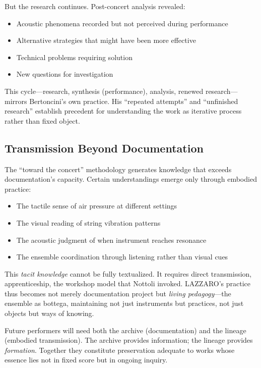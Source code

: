 But the research continues. Post-concert analysis revealed:
\begin{itemize}
  \item Acoustic phenomena recorded but not perceived during performance
  \item Alternative strategies that might have been more effective
  \item Technical problems requiring solution
  \item New questions for investigation
\end{itemize}

This cycle---research, synthesis (performance), analysis, renewed research---
mirrors Bertoncini's own practice. His ``repeated attempts'' and ``unfinished 
research'' establish precedent for understanding the work as iterative process 
rather than fixed object.

\subsection{Transmission Beyond Documentation}

The ``toward the concert'' methodology generates knowledge that exceeds 
documentation's capacity. Certain understandings emerge only through embodied 
practice:
\begin{itemize}
  \item The tactile sense of air pressure at different settings
  \item The visual reading of string vibration patterns
  \item The acoustic judgment of when instrument reaches resonance
  \item The ensemble coordination through listening rather than visual cues
\end{itemize}

This \emph{tacit knowledge} \cite{polanyi1966} cannot be fully textualized. It 
requires direct transmission, apprenticeship, the workshop model that Nottoli 
invoked. LAZZARO's practice thus becomes not merely documentation project but 
\emph{living pedagogy}---the ensemble as bottega, maintaining not just 
instruments but practices, not just objects but ways of knowing.

Future performers will need both the archive (documentation) and the lineage 
(embodied transmission). The archive provides information; the lineage provides 
\emph{formation}. Together they constitute preservation adequate to works whose 
essence lies not in fixed score but in ongoing inquiry.

